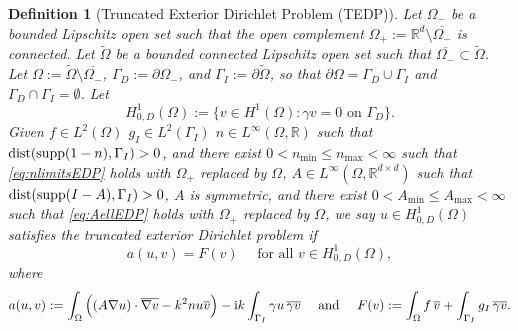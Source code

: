 \documentclass[10pt]{article}%
\newtheorem{definition}[theorem]{Definition}
\numberwithin{equation}{section}
\newcommand{\beq}{\begin{equation}}
\newcommand{\eeq}{\end{equation}}
\newcommand{\beqs}{\begin{equation*}}
\newcommand{\eeqs}{\end{equation*}}
\newcommand{\bit}{\begin{itemize}}
\newcommand{\eit}{\end{itemize}}
\newcommand{\cL}{{\cal L}}
\newcommand{\opL}{\cL}
\newcommand{\bx}{\mathbf{x}}
\newcommand{\supp}{\mathrm{supp}}
\newcommand{\ri}{{\rm i}}
\newcommand{\Rea}{\mathbb{R}}
\newcommand{\dist}{\mathop{{\rm dist}}}
\newcommand{\pdiff}[2]{\frac{\partial #1}{\partial #2}}
\newcommand{\dudnu}{\pdiff{u}{\nu}}
\newcommand{\gu}{\nabla u}
\newcommand{\gvb}{\overline{\nabla v}}
\newcommand{\vb}{\overline{v}}
\newcommand{\ton}{\text{ on }}
\newcommand{\tin}{\text{ in }}
\newcommand{\tfa}{\text{ for all }}
\newcommand{\tand}{\text{ and }}
\newcommand{\tst}{\text{ such that }}
\newcommand{\domain}{\Omega}
\begin{document}
\begin{definition}[Truncated Exterior Dirichlet Problem (TEDP)]\label{def:TEDP}
Let $\domain_-$ be a bounded Lipschitz open set such that the open complement $\domain_+:= \Rea^d\setminus \overline{\domain_-}$ is connected. 
Let $\widetilde{\domain}$ be a bounded connected Lipschitz open set such that $\overline{\domain_-}\subset \widetilde{\domain}$. 
Let $\domain:=\widetilde{\domain}\setminus\overline{\domain_-}$, $\Gamma_D:= \partial \domain_-$, and $\Gamma_I :=\partial \widetilde{\domain}$, so that $\partial \domain= \Gamma_D \cup \Gamma_I$ and $\Gamma_D\cap \Gamma_I = \emptyset$. Let %
\beqs
H_{0,D}^1(\domain):= \big\{ v\in H^1(\domain) : \gamma v=0 \ton \Gamma_D\big\}.
\eeqs
Given 
$f\in L^2(\domain)$ 
$g_I\in L^2(\Gamma_I)$
$n\in L^\infty(\domain,\Rea)$ such that $\dist(\supp(1-n),\Gamma_I)>0$, and there exist $0<n_{\min}\leq n_{\max}<\infty$ such that
\eqref{eq:nlimitsEDP} holds with $\domain_+$ replaced by $\domain$,
$A \in L^\infty(\domain , \Rea^{d\times d})$ such that $\dist(\supp(I -A),\Gamma_I)>0$, $A$ is symmetric, and there exist $0<A_{\min}\leq A_{\max}<\infty$ such that
\eqref{eq:AellEDP} holds with $\domain_+$ replaced by $\domain$,
we say $u\in H^1_{0,D}(\domain)$ satisfies the truncated exterior Dirichlet problem if
\beq\label{eq:TEDPvar}
a(u,v)=F(v) \quad \tfa v\in H^1_{0,D}(\domain),
\eeq
where
\beq\label{eq:TEDPa}
a(u,v):= \int_\domain 
\Big((A \gu)\cdot\gvb
- k^2 n u\vb\Big) - \ri k \int_{\Gamma_I}\gamma u\, \overline{\gamma v} \quad\tand\quad
F(v):= \int_\domain f\, \vb + \int_{\Gamma_I} g_I \, \overline{\gamma v}.
\eeq
\end{definition}
\end{document}
